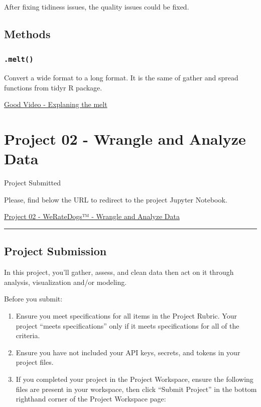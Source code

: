 \documentclass[]{book}
\begin{document}
After fixing tidiness issues, the quality issues could be fixed.

\subsection{Methods}\label{methods}

\subsubsection{\texorpdfstring{\texttt{.melt()}}{.melt()}}\label{melt}

Convert a wide format to a long format. It is the same of gather and
spread functions from tidyr R package.

\href{https://www.youtube.com/watch?v=qOkj5zOHwRE}{Good Video -
Explaning the melt}

\section{Project 02 - Wrangle and Analyze
Data}\label{project-02---wrangle-and-analyze-data}

Project Submitted

Please, find below the URL to redirect to the project Jupyter Notebook.

\href{https://github.com/AndersonUyekita/ND111_data_science_foundations_02/blob/master/03-Chapter03/00-Project_02/wrangle_act.ipynb}{Project
02 - WeRateDogs™ - Wrangle and Analyze Data}

\begin{center}\rule{0.5\linewidth}{\linethickness}\end{center}

\subsection{Project Submission}\label{project-submission-1}

In this project, you'll gather, assess, and clean data then act on it
through analysis, visualization and/or modeling.

Before you submit:

\begin{enumerate}
\def\labelenumi{\arabic{enumi}.}
\item
  Ensure you meet specifications for all items in the Project Rubric.
  Your project ``meets specifications'' only if it meets specifications
  for all of the criteria.
\item
  Ensure you have not included your API keys, secrets, and tokens in
  your project files.
\item
  If you completed your project in the Project Workspace, ensure the
  following files are present in your workspace, then click ``Submit
  Project'' in the bottom righthand corner of the Project Workspace
  page:
\end{enumerate}
\end{document}
